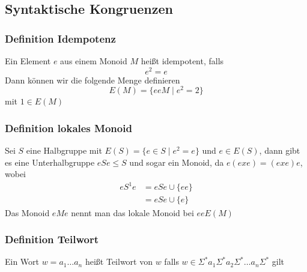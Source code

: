 \documentclass[12pt, german]{article}
\newcommand{\sigstern}{\Sigma^\ast}
\begin{document}
	\subsection{Syntaktische Kongruenzen}
	\subsubsection{Definition Idempotenz}
	Ein Element $e$ aus einem Monoid $M$ heißt idempotent, falls $$e^2 = e$$
	Dann können wir die folgende Menge definieren $$E(M) = \{ eeM \mid e^2 = 2\}$$ mit $1\in E(M)$
	
	\subsubsection{Definition lokales Monoid}
	Sei $S$ eine Halbgruppe mit $E(S) = \{e \in S \mid e^2 = e\}$  und $e \in E(S)$, dann gibt es eine Unterhalbgruppe $eSe \leq S$ und sogar ein Monoid, da 	$e(exe) = (exe)e$, wobei 
	\begin{align*}
		eS^1e &= eSe \cup \{ee\} \\
		&=eSe \cup \{e\}
	\end{align*}
	Das Monoid $eMe$ nennt man das lokale Monoid bei $eeE(M)$
	
	\subsubsection{Definition Teilwort}
	Ein Wort $w = a_1 \ldots a_n$ heißt Teilwort von $w$ falls $w \in \sigstern a_1 \sigstern a_2 \sigstern \ldots a_n\sigstern$ gilt
	
\end{document}
